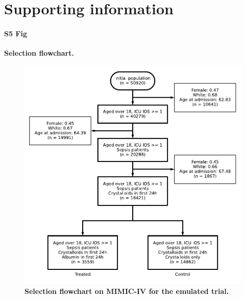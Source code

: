 \documentclass[10pt,letterpaper]{article}
\begin{document}
\vspace*{0.2in}

\section*{Supporting information}

\paragraph*{S5 Fig}
\label{apd:selection_flowchart}
{\bf Selection flowchart.}

\begin{figure}[!htb]
  \centering
  \includegraphics[width=0.7\linewidth]{img_supp_final/albumin_for_sepsis__obs_1d__flowchart_albumin_for_sepsis.pdf}
  \caption{\textbf{Selection flowchart on MIMIC-IV for the emulated trial.}}\label{fig:selection_flowchart}
\end{figure}
\end{document}
